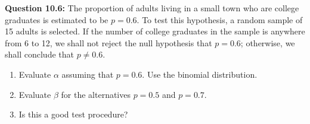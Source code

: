 \documentclass{article}
\begin{document}
\textbf{Question 10.6:}
The proportion of adults living in a small town
who are college graduates is estimated to be $p = 0.6$.
To test this hypothesis, a random sample of 15 adults
is selected. If the number of college graduates in the
sample is anywhere from 6 to 12, we shall not reject
the null hypothesis that $p = 0.6$; otherwise, we shall
conclude that $p \not= 0.6$.
\begin{enumerate}[label=(\alph*)]
    \item Evaluate $\alpha$ assuming that $p = 0.6$. Use the 
    binomial distribution.
    \item Evaluate $\beta$ for the alternatives $p = 0.5$ and 
    $p = 0.7$.
    \item Is this a good test procedure?
\end{enumerate}
\end{document}
